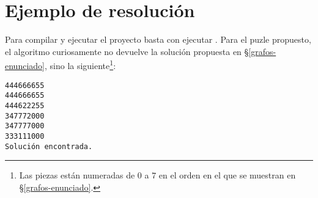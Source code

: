 \section{Ejemplo de resolución}\label{grafos-resolucion}

Para compilar y ejecutar el proyecto basta con ejecutar .
Para el puzle propuesto, el algoritmo curiosamente no devuelve la solución propuesta en \S\ref{grafos-enunciado}, sino la siguiente\footnote{%
	Las piezas están numeradas de $0$ a $7$ en el orden en el que se muestran en \S\ref{grafos-enunciado}.
}:

\begin{lstlisting}
444666655
444666655
444622255
347772000
347777000
333111000
Solución encontrada.
\end{lstlisting}
